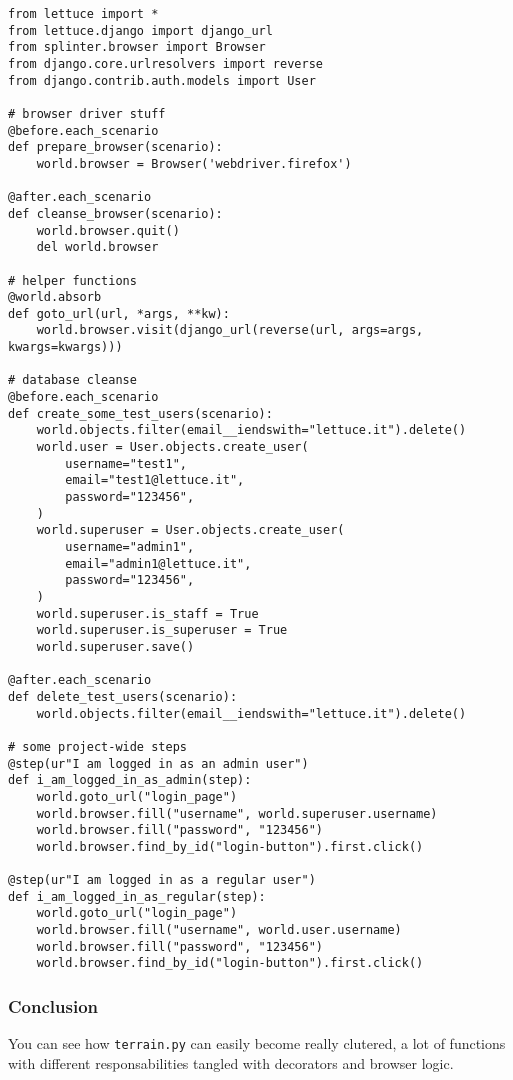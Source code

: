 \documentclass[letterpaper]{article}
\begin{document}
\footnotesize
\begin{verbatim}
from lettuce import *
from lettuce.django import django_url
from splinter.browser import Browser
from django.core.urlresolvers import reverse
from django.contrib.auth.models import User

# browser driver stuff
@before.each_scenario
def prepare_browser(scenario):
    world.browser = Browser('webdriver.firefox')

@after.each_scenario
def cleanse_browser(scenario):
    world.browser.quit()
    del world.browser

# helper functions
@world.absorb
def goto_url(url, *args, **kw):
    world.browser.visit(django_url(reverse(url, args=args, kwargs=kwargs)))

# database cleanse
@before.each_scenario
def create_some_test_users(scenario):
    world.objects.filter(email__iendswith="lettuce.it").delete()
    world.user = User.objects.create_user(
        username="test1",
        email="test1@lettuce.it",
        password="123456",
    )
    world.superuser = User.objects.create_user(
        username="admin1",
        email="admin1@lettuce.it",
        password="123456",
    )
    world.superuser.is_staff = True
    world.superuser.is_superuser = True
    world.superuser.save()

@after.each_scenario
def delete_test_users(scenario):
    world.objects.filter(email__iendswith="lettuce.it").delete()

# some project-wide steps
@step(ur"I am logged in as an admin user")
def i_am_logged_in_as_admin(step):
    world.goto_url("login_page")
    world.browser.fill("username", world.superuser.username)
    world.browser.fill("password", "123456")
    world.browser.find_by_id("login-button").first.click()

@step(ur"I am logged in as a regular user")
def i_am_logged_in_as_regular(step):
    world.goto_url("login_page")
    world.browser.fill("username", world.user.username)
    world.browser.fill("password", "123456")
    world.browser.find_by_id("login-button").first.click()

\end{verbatim}
\normalsize

\subsubsection*{Conclusion}
You can see how \texttt{terrain.py} can easily become really clutered,
a lot of functions with different responsabilities tangled with
decorators and browser logic.
\end{document}

